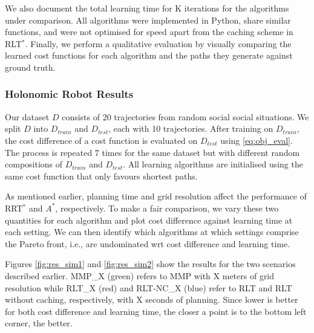 \documentclass[letterpaper, 10 pt, conference]{ieeeconf}
\begin{document}
We also document the total learning time for K iterations for the algorithms under comparison.  All algorithms were implemented in Python, share similar functions, and were not optimised for speed apart from the caching scheme in RLT$^*$. Finally, we perform a qualitative evaluation by visually comparing the learned cost functions for each algorithm and the paths they generate against ground truth.

	\subsubsection{Holonomic Robot Results}

	Our dataset $D$ consists of 20 trajectories from random social social situations. We split $D$ into $D_{train}$ and $D_{test}$, each with 10 trajectories. After training on $D_{train}$, the cost difference of a cost function is evaluated on $D_{test}$ using \eqref{eq:obj_eval}. The process is repeated 7 times for the same dataset but with different random compositions of $D_{train}$ and $D_{test}$.  All learning algorithms are initialised using the same cost function that only favours shortest paths.
	
	As mentioned earlier, planning time and grid resolution affect the performance of RRT$^*$ and $A^*$, respectively. To make a fair comparison, we vary these two quantities for each algorithm and plot cost difference against learning time at each setting.  We can then identify which algorithms at which settings comprise the Pareto front, i.e., are undominated wrt cost difference and learning time.
	
	 Figures \ref{fig:res_sim1} and \ref{fig:res_sim2} show the results for the two scenarios described earlier. MMP\_X (green) refers to MMP with X meters of grid resolution while  RLT\_X (red) and RLT-NC\_X (blue) refer to RLT and RLT without caching, respectively, with X seconds of planning.  Since lower is better for both cost difference and learning time, the closer a point is to the bottom left corner, the better.
	 
\end{document}
